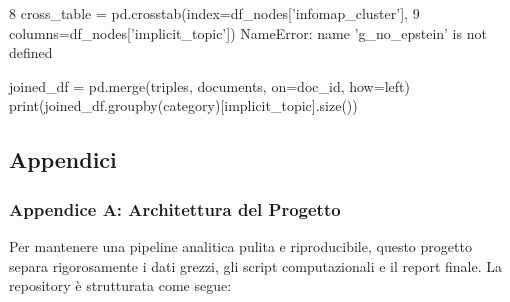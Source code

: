 \documentclass[
  italian,
  a4paper,
]{article}
\newenvironment{Shaded}{\begin{snugshade}}{\end{snugshade}}
\newcommand{\BuiltInTok}[1]{\textcolor[rgb]{0.00,0.23,0.31}{#1}}
\newcommand{\NormalTok}[1]{\textcolor[rgb]{0.00,0.23,0.31}{#1}}
\newcommand{\OperatorTok}[1]{\textcolor[rgb]{0.37,0.37,0.37}{#1}}
\newcommand{\StringTok}[1]{\textcolor[rgb]{0.13,0.47,0.30}{#1}}
\begin{document}
\begin{Highlighting}
\textcolor{QuartoInternalColor2}{}\textcolor{QuartoInternalColor4}{      8}\textcolor{QuartoInternalColor2}{ cross\_table }\textcolor{QuartoInternalColor5}{=}\textcolor{QuartoInternalColor2}{ pd}\textcolor{QuartoInternalColor5}{.}\textcolor{QuartoInternalColor2}{crosstab(index}\textcolor{QuartoInternalColor5}{=}\textcolor{QuartoInternalColor2}{df\_nodes[}\textcolor{QuartoInternalColor6}{'}\textcolor{QuartoInternalColor2}{}\textcolor{QuartoInternalColor6}{infomap\_cluster}\textcolor{QuartoInternalColor2}{}\textcolor{QuartoInternalColor6}{'}\textcolor{QuartoInternalColor2}{], }
\textcolor{QuartoInternalColor2}{}\textcolor{QuartoInternalColor4}{      9}\textcolor{QuartoInternalColor2}{                           columns}\textcolor{QuartoInternalColor5}{=}\textcolor{QuartoInternalColor2}{df\_nodes[}\textcolor{QuartoInternalColor6}{'}\textcolor{QuartoInternalColor2}{}\textcolor{QuartoInternalColor6}{implicit\_topic}\textcolor{QuartoInternalColor2}{}\textcolor{QuartoInternalColor6}{'}\textcolor{QuartoInternalColor2}{])}
\textcolor{QuartoInternalColor2}{}\textcolor{QuartoInternalColor1}{NameError}\textcolor{QuartoInternalColor2}{: name 'g\_no\_epstein' is not defined}
\end{Highlighting}

\begin{Shaded}
\begin{Highlighting}[]

\NormalTok{joined\_df }\OperatorTok{=}\NormalTok{ pd.merge(triples, documents, on}\OperatorTok{=}\StringTok{\textquotesingle{}doc\_id\textquotesingle{}}\NormalTok{, how}\OperatorTok{=}\StringTok{\textquotesingle{}left\textquotesingle{}}\NormalTok{)}
\BuiltInTok{print}\NormalTok{(joined\_df.groupby(}\StringTok{\textquotesingle{}category\textquotesingle{}}\NormalTok{)[}\StringTok{\textquotesingle{}implicit\_topic\textquotesingle{}}\NormalTok{].size())}
\end{Highlighting}
\end{Shaded}

\subsection{Appendici}\label{appendici}

\subsubsection{Appendice A: Architettura del
Progetto}\label{sec-architecture}

Per mantenere una pipeline analitica pulita e riproducibile, questo
progetto separa rigorosamente i dati grezzi, gli script computazionali e
il report finale. La repository è strutturata come segue:
\end{document}
